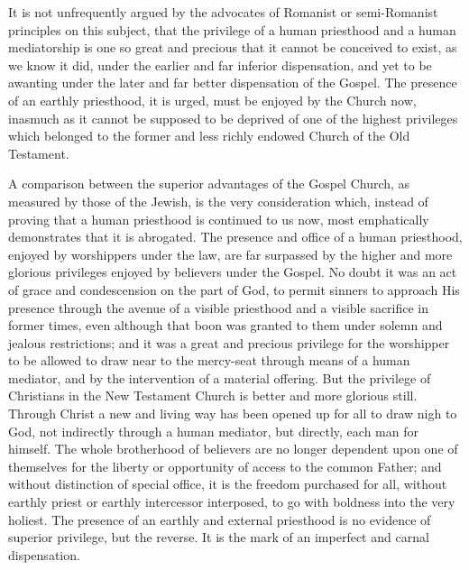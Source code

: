\documentclass[]{book}
\begin{document}
It is not unfrequently argued by the advocates of Romanist or semi-Romanist principles on this subject, that the privilege of a human priesthood and a human mediatorship is one so great and precious that it cannot be conceived to exist, as we know it did, under the earlier and far inferior dispensation, and yet to be awanting under the later and far better dispensation of the Gospel. The presence of an earthly priesthood, it is urged, must be enjoyed by the Church now, inasmuch as it cannot be supposed to be deprived of one of the highest privileges which belonged to the former and less richly endowed Church of the Old Testament.

A comparison between the superior advantages of the Gospel Church, as measured by those of the Jewish, is the very consideration which, instead of proving that a human priesthood is continued to us now, most emphatically demonstrates that it is abrogated. The presence and office of a human priesthood, enjoyed by worshippers under the law, are far surpassed by the higher and more glorious privileges enjoyed by believers under the Gospel. No doubt it was an act of grace and condescension on the part of God, to permit sinners to approach His presence through the avenue of a visible priesthood and a visible sacrifice in former times, even although that boon was granted to them under solemn and jealous restrictions; and it was a great and precious privilege for the worshipper to be allowed to draw near to the mercy-seat through means of a human mediator, and by the intervention of a material offering. But the privilege of Christians in the New Testament Church is better and more glorious still. Through Christ a new and living way has been opened up for all to draw nigh to God, not indirectly through a human mediator, but directly, each man for himself. The whole brotherhood of believers are no longer dependent upon one of themselves for the liberty or opportunity of access to the common Father; and without distinction of special office, it is the freedom purchased for all, without earthly priest or earthly intercessor interposed, to go with boldness into the very holiest. The presence of an earthly and external priesthood is no evidence of superior privilege, but the reverse. It is the mark of an imperfect and carnal dispensation.
\end{document}
